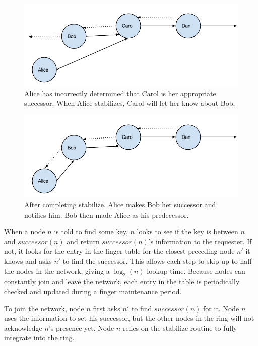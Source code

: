 \documentclass[10pt, conference, compsocconf]{IEEEtran}
\begin{document}
\begin{figure}
    \includegraphics[width=\linewidth]{abcd1}
    \caption{Alice has incorrectly determined that Carol is her appropriate successor.  When Alice stabilizes, Carol will let her know about Bob.}
    \label{abcd1}
\end{figure}


\begin{figure}
    \includegraphics[width=\linewidth]{abcd2}
    \caption{After completing stabilize, Alice makes Bob her successor and notifies him. Bob then made Alice as his predecessor.}
    \label{abcd2}
\end{figure}



When a node $n$ is told to find some key, $n$ looks to see if the key is between $n$ and $successor(n)$ and return $successor(n)$'s information to the requester. If not, it looks for the entry in the finger table for the closest preceding node $n'$ it knows and asks $n'$ to find the successor.  This allows each step to skip up to half the nodes in the network, giving a $\log_2(n)$ lookup time.  Because nodes can constantly join and leave the network, each entry in the table is periodically checked and updated during a finger maintenance period. 

To join the network, node $n$ first asks $n'$ to find $successor(n)$ for it.  Node $n$ uses the information to set his successor, but the other nodes in the ring will not acknowledge $n$'s presence yet.  Node $n$ relies on the stabilize routine to fully integrate into the ring.
\end{document}
